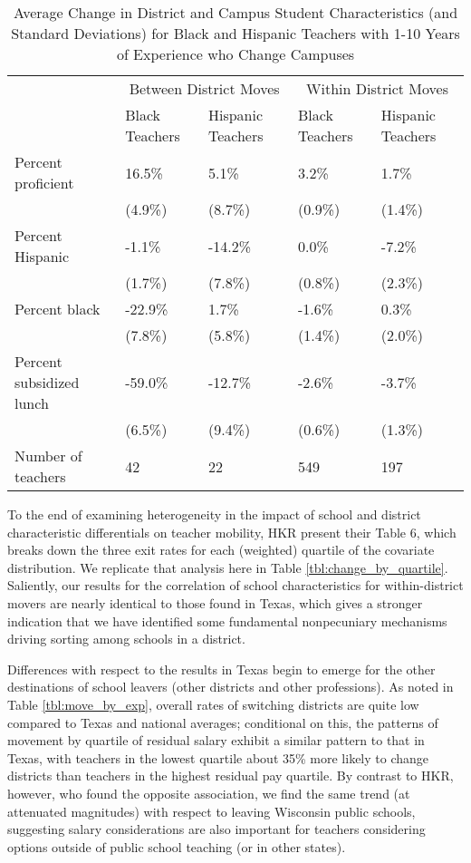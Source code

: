 \documentclass[]{article}
\begin{document}
\begin{table}[htbp]
\centering
\begin{tabular}{lp{}p{}p{}p{}}
  \hline
 & \multicolumn{2}{c}{Between District Moves} & \multicolumn{2}{c}{Within District Moves}\\ \cline{2-5}
 & Black Teachers & Hispanic Teachers & Black Teachers & Hispanic Teachers \\
  \hline
Percent proficient & 16.5\% & 5.1\% & 3.2\% & 1.7\% \\ 
   & (4.9\%) & (8.7\%) & (0.9\%) & (1.4\%) \\ 
  Percent Hispanic & -1.1\% & -14.2\% & 0.0\% & -7.2\% \\ 
   & (1.7\%) & (7.8\%) & (0.8\%) & (2.3\%) \\ 
  Percent black & -22.9\% & 1.7\% & -1.6\% & 0.3\% \\ 
   & (7.8\%) & (5.8\%) & (1.4\%) & (2.0\%) \\ 
  Percent subsidized lunch & -59.0\% & -12.7\% & -2.6\% & -3.7\% \\ 
   & (6.5\%) & (9.4\%) & (0.6\%) & (1.3\%) \\ 
  Number of teachers & 42 & 22 & 549 & 197 \\ 
   \hline
\end{tabular}
\caption{Average Change in District and Campus Student Characteristics (and Standard Deviations) for Black and Hispanic Teachers with 1-10 Years of Experience who Change Campuses} 
\label{tbl:change_by_eth}
\end{table}

To the end of examining heterogeneity in the impact of school and
district characteristic differentials on teacher mobility, HKR present
their Table 6, which breaks down the three exit rates for each
(weighted) quartile of the covariate distribution. We replicate that
analysis here in Table \ref{tbl:change_by_quartile}. Saliently, our
results for the correlation of school characteristics for
within-district movers are nearly identical to those found in Texas,
which gives a stronger indication that we have identified some
fundamental nonpecuniary mechanisms driving sorting among schools in a
district.

Differences with respect to the results in Texas begin to emerge for the
other destinations of school leavers (other districts and other
professions). As noted in Table \ref{tbl:move_by_exp}, overall rates of
switching districts are quite low compared to Texas and national
averages; conditional on this, the patterns of movement by quartile of
residual salary exhibit a similar pattern to that in Texas, with
teachers in the lowest quartile about 35\% more likely to change
districts than teachers in the highest residual pay quartile. By
contrast to HKR, however, who found the opposite association, we find
the same trend (at attenuated magnitudes) with respect to leaving
Wisconsin public schools, suggesting salary considerations are also
important for teachers considering options outside of public school
teaching (or in other states).
\end{document}
